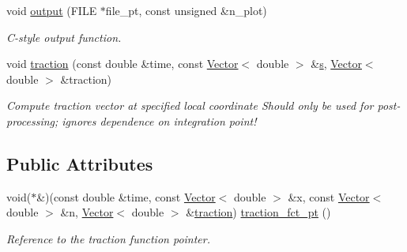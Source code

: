 \begin{DoxyCompactItemize}
void \hyperlink{classoomph_1_1AxisymmetricNavierStokesTractionElement_a19e8ff226642b931a736c7b6184b826c}{output} (F\+I\+LE $\ast$file\+\_\+pt, const unsigned \&n\+\_\+plot)
\begin{DoxyCompactList}\small\item\em C-\/style output function. \end{DoxyCompactList}\item 
void \hyperlink{classoomph_1_1AxisymmetricNavierStokesTractionElement_a467d411cab5179a2437fa762a0df2a02}{traction} (const double \&time, const \hyperlink{classoomph_1_1Vector}{Vector}$<$ double $>$ \&\hyperlink{cfortran_8h_ab7123126e4885ef647dd9c6e3807a21c}{s}, \hyperlink{classoomph_1_1Vector}{Vector}$<$ double $>$ \&traction)
\begin{DoxyCompactList}\small\item\em Compute traction vector at specified local coordinate Should only be used for post-\/processing; ignores dependence on integration point! \end{DoxyCompactList}\end{DoxyCompactItemize}
\subsection*{Public Attributes}
\begin{DoxyCompactItemize}
\item 
void($\ast$\&)(const double \&time, const \hyperlink{classoomph_1_1Vector}{Vector}$<$ double $>$ \&x, const \hyperlink{classoomph_1_1Vector}{Vector}$<$ double $>$ \&n, \hyperlink{classoomph_1_1Vector}{Vector}$<$ double $>$ \&\hyperlink{classoomph_1_1AxisymmetricNavierStokesTractionElement_a467d411cab5179a2437fa762a0df2a02}{traction}) \hyperlink{classoomph_1_1AxisymmetricNavierStokesTractionElement_abed4930a57bc16a6187c7ff011e57ea3}{traction\+\_\+fct\+\_\+pt} ()
\begin{DoxyCompactList}\small\item\em Reference to the traction function pointer. \end{DoxyCompactList}\end{DoxyCompactItemize}
